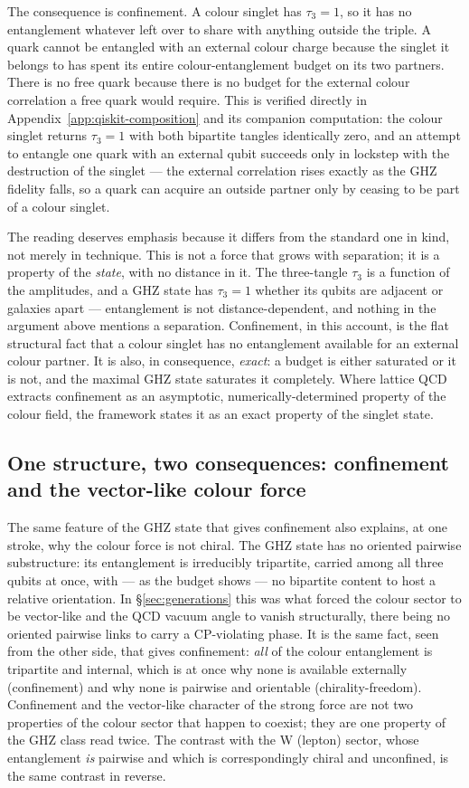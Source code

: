 The consequence is confinement. A colour singlet has $\tau_3 = 1$, so it has no entanglement
whatever left over to share with anything outside the triple. A quark cannot be entangled with an
external colour charge because the singlet it belongs to has spent its entire colour-entanglement
budget on its two partners. There is no free quark because there is no budget for the external
colour correlation a free quark would require. This is verified directly in
Appendix~\ref{app:qiskit-composition} and its companion computation: the colour singlet returns
$\tau_3 = 1$ with both bipartite tangles identically zero, and an attempt to entangle one quark with
an external qubit succeeds only in lockstep with the destruction of the singlet --- the external
correlation rises exactly as the GHZ fidelity falls, so a quark can acquire an outside partner only
by ceasing to be part of a colour singlet.

The reading deserves emphasis because it differs from the standard one in kind, not merely in
technique. This is not a force that grows with separation; it is a property of the \emph{state},
with no distance in it. The three-tangle $\tau_3$ is a function of the amplitudes, and a GHZ state
has $\tau_3 = 1$ whether its qubits are adjacent or galaxies apart --- entanglement is not
distance-dependent, and nothing in the argument above mentions a separation. Confinement, in this
account, is the flat structural fact that a colour singlet has no entanglement available for an
external colour partner. It is also, in consequence, \emph{exact}: a budget is either saturated or
it is not, and the maximal GHZ state saturates it completely. Where lattice QCD extracts confinement
as an asymptotic, numerically-determined property of the colour field, the framework states it as an
exact property of the singlet state.

\subsection{One structure, two consequences: confinement and the vector-like colour force}

The same feature of the GHZ state that gives confinement also explains, at one stroke, why the
colour force is not chiral. The GHZ state has no oriented pairwise substructure: its entanglement is
irreducibly tripartite, carried among all three qubits at once, with --- as the budget shows --- no
bipartite content to host a relative orientation. In \S\ref{sec:generations} this was what forced
the colour sector to be vector-like and the QCD vacuum angle to vanish structurally, there being no
oriented pairwise links to carry a CP-violating phase. It is the same fact, seen from the other side,
that gives confinement: \emph{all} of the colour entanglement is tripartite and internal, which is
at once why none is available externally (confinement) and why none is pairwise and orientable
(chirality-freedom). Confinement and the vector-like character of the strong force are not two
properties of the colour sector that happen to coexist; they are one property of the GHZ class read
twice. The contrast with the W (lepton) sector, whose entanglement \emph{is} pairwise and which is
correspondingly chiral and unconfined, is the same contrast in reverse.

